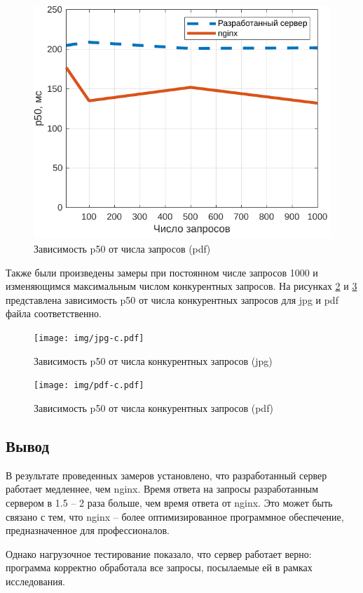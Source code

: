 \captionsetup{singlelinecheck = false, justification=centering}
\begin{figure}[H]
	\centering
	\includegraphics[scale=0.9]{img/pdf.pdf}
	\caption{Зависимость p50 от числа запросов (pdf)}
	\label{pdf-comparison-n}
\end{figure}

Также были произведены замеры при постоянном числе запросов 1000 и изменяющимся максимальным числом конкурентных запросов. На рисунках \ref{jpg-comparison-c} и \ref{pdf-comparison-c} представлена зависимость p50 от числа конкурентных запросов для jpg и pdf файла соответственно.

\begin{figure}[H]
	\centering
	\texttt{[image: img/jpg-с.pdf]}
	\caption{Зависимость p50 от числа конкурентных запросов (jpg)}
	\label{jpg-comparison-c}
\end{figure}

\captionsetup{singlelinecheck = false, justification=centering}
\begin{figure}[H]
	\centering
	\texttt{[image: img/pdf-с.pdf]}
	\caption{Зависимость p50 от числа конкурентных запросов (pdf)}
	\label{pdf-comparison-c}
\end{figure}

\subsection*{Вывод}

В результате проведенных замеров установлено, что разработанный сервер работает медленнее, чем nginx. Время ответа на запросы разработанным сервером в 1.5 -- 2 раза больше, чем время ответа от nginx. Это может быть связано с тем, что nginx -- более оптимизированное программное обеспечение, предназначенное для профессионалов.

Однако нагрузочное тестирование показало, что сервер работает верно: программа корректно обработала все запросы, посылаемые ей в рамках исследования.

\pagebreak